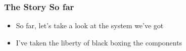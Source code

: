 \documentclass{beamer}
\begin{document}
    		\begin{frame}
    			\frametitle{The Story So far}
    			\begin{itemize}
    				\item So far, let's take a look at the system we've got
    				\item I've taken the liberty of black boxing the components
    			\end{itemize}
    			
    			


\begin{tikzpicture}[x=0.75pt,y=0.75pt,yscale=-1,xscale=1]


\end{tikzpicture}
\end{frame}
\end{document}
